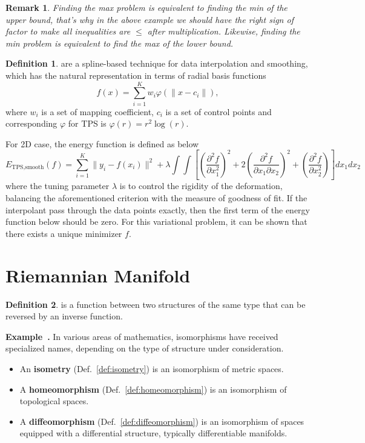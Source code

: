 \documentclass[a4paper]{article}
\theoremstyle{definition}
\newtheorem{definition}{Definition}
\theoremstyle{plain}
\newtheorem{remark}{Remark}
\newcounter{example}{Example}
\newenvironment{example}[1][]{\refstepcounter{example}\par\medskip
   \noindent \textbf{Example~\theexample. #1} \rmfamily}{\medskip}
\begin{document}
\begin{remark}
Finding the max problem is equivalent to finding the min of the upper bound, that's why in the above example we should have the right sign of factor to make all inequalities are $\le$ after multiplication. Likewise, finding the min problem is equivalent to find the max of the lower bound.
\end{remark}

\begin{definition}
 are a spline-based technique for data interpolation and smoothing, which has the natural representation in terms of radial basis functions
\begin{equation*}
    f(x)=\sum^K_{i=1}w_i\varphi(\|x-c_i\|),
\end{equation*}
where $w_i$ is a set of mapping coefficient, $c_i$ is a set of control points and corresponding $\varphi$ for TPS is $\varphi(r)=r^2\log(r)$.

For 2D case, the energy function is defined as below
\begin{equation*}
    E_{\text{TPS},\text{smooth}}(f)=\sum^K_{i=1}\|y_i-f(x_i)\|^2+\lambda\int\int\left[\left(\frac{\partial^2 f}{\partial x^2_1}\right)^2+2\left(\frac{\partial^2f}{\partial x_1\partial x_2}\right)^2+\left(\frac{\partial^2f}{\partial x_2^2}\right)\right]dx_1dx_2
\end{equation*}
where the tuning parameter $\lambda$ is to control the rigidity of the deformation, balancing the aforementioned criterion with the measure of goodness of fit. If the interpolant pass through the data points exactly, then the first term of the energy function below should be zero. For this variational problem, it can be shown that there exists a unique minimizer $f$.
\end{definition}

\section{Riemannian Manifold\cite{fletcher,hao,zhang}}
\begin{definition}
 is a function between two structures of the same type that can be reversed by an inverse function.
\end{definition}

\begin{example}
In various areas of mathematics, isomorphisms have received specialized names, depending on the type of structure under consideration.
\begin{itemize}
    \item An \textbf{isometry} (Def.~\ref{def:isometry}) is an isomorphism of metric spaces.
    \item A \textbf{homeomorphism} (Def.~\ref{def:homeomorphism}) is an isomorphism of topological spaces.
    \item A \textbf{diffeomorphism} (Def.~\ref{def:diffeomorphism}) is an isomorphism of spaces equipped with a differential structure, typically differentiable manifolds.
\end{itemize}
\end{example}
\end{document}
